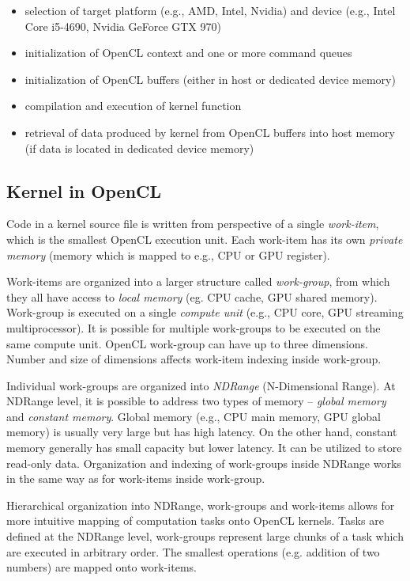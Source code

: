 \documentclass
[
    digital, %
    oneside, %
    table, %
    nolof, %
    nolot, %
    nocover %
]{fithesis3}
\begin{document}
\begin{itemize}
    \item selection of target platform (e.g., AMD, Intel, Nvidia) and device (e.g., Intel Core i5-4690, Nvidia GeForce GTX 970)
    \item initialization of OpenCL context and one or more command queues
    \item initialization of OpenCL buffers (either in host or dedicated device memory)
    \item compilation and execution of kernel function
    \item retrieval of data produced by kernel from OpenCL buffers into host memory (if data is located in dedicated device memory)
\end{itemize}

\subsection{Kernel in OpenCL}
\label{kernel}
Code in a kernel source file is written from perspective of a single \textit{work-item}, which is the smallest OpenCL execution unit. Each work-item
has its own \textit{private memory} (memory which is mapped to e.g., CPU or GPU register).

Work-items are organized into a larger structure called \textit{work-group}, from which they all have access to \textit{local memory} (eg. CPU cache,
GPU shared memory). Work-group is executed on a single \textit{compute unit} (e.g., CPU core, GPU streaming multiprocessor). It is possible for
multiple work-groups to be executed on the same compute unit. OpenCL work-group can have up to three dimensions. Number and size of dimensions affects
work-item indexing inside work-group.

Individual work-groups are organized into \textit{NDRange} (N-Dimensional Range). At NDRange level, it is possible to address two types of memory --
\textit{global memory} and \textit{constant memory}. Global memory (e.g., CPU main memory, GPU global memory) is usually very large but has high
latency. On the other hand, constant memory generally has small capacity but lower latency. It can be utilized to store read-only data. Organization
and indexing of work-groups inside NDRange works in the same way as for work-items inside work-group.

Hierarchical organization into NDRange, work-groups and work-items allows for more intuitive mapping of computation tasks onto OpenCL kernels. Tasks
are defined at the NDRange level, work-groups represent large chunks of a task which are executed in arbitrary order. The smallest operations (e.g.
addition of two numbers) are mapped onto work-items.
\end{document}
